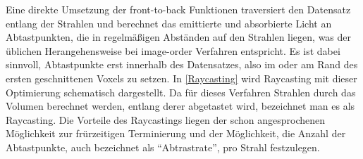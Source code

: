 \documentclass[a4paper,fontsize=12pt,toc=bib,halfparskip,ngerman]{scrartcl}
\begin{document}
Eine direkte Umsetzung der front-to-back Funktionen traversiert den Datensatz entlang der Strahlen und berechnet das emittierte und absorbierte Licht an Abtastpunkten, die in regelm\"a{\ss}igen Abst\"anden auf den Strahlen liegen, was der \"ublichen Herangehensweise bei image-order Verfahren entspricht. Es ist dabei sinnvoll, Abtastpunkte erst innerhalb des Datensatzes, also im oder am Rand des ersten geschnittenen Voxels zu setzen. In \cref{Raycasting} wird Raycasting mit dieser Optimierung schematisch dargestellt. 
Da f\"ur dieses Verfahren Strahlen durch das Volumen berechnet werden, entlang derer abgetastet wird, bezeichnet man es als Raycasting. Die Vorteile des Raycastings liegen der schon angesprochenen M\"oglichkeit zur fr\"urzeitigen Terminierung und der M\"oglichkeit, die Anzahl der Abtastpunkte, auch bezeichnet als ``Abtrastrate'', pro Strahl festzulegen.
\end{document}
